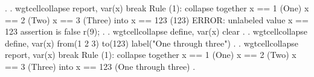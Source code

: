 {\smallskip}
. 
. wgtcellcollapse report, var(x) break
{\smallskip}
Rule (1): collapse together
  x == 1 (One)
  x == 2 (Two)
  x == 3 (Three)
  into x == 123 (123)
  ERROR: unlabeled value x == 123
assertion is false
r(9);
{\smallskip}
. 
. wgtcellcollapse define, var(x) clear
{\smallskip}
. 
. wgtcellcollapse define, var(x) from(1 2 3) to(123) label("One through three")
{\smallskip}
. 
. wgtcellcollapse report, var(x) break
{\smallskip}
Rule (1): collapse together
  x == 1 (One)
  x == 2 (Two)
  x == 3 (Three)
  into x == 123 (One through three)
{\smallskip}
{\smallskip}
. 
